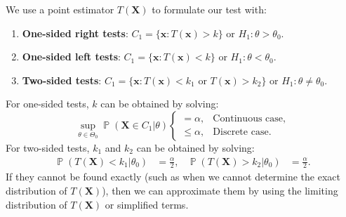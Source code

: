 \documentclass{huhtakm-template-book-v2}
\DeclareMathOperator{\prob}{\mathbb{P}}
\begin{document}
    \begin{rem}
        We use a point estimator $T(\mathbf{X})$ to formulate our test with:
        \begin{enumerate}
            \item \textbf{One-sided right tests}: $C_{1}=\{\mathbf{x}:T(\mathbf{x})>k\}$ or $H_{1}:\theta>\theta_{0}$.
            \item \textbf{One-sided left tests}: $C_{1}=\{\mathbf{x}:T(\mathbf{x})<k\}$ or $H_{1}:\theta<\theta_{0}$.
            \item \textbf{Two-sided tests}: $C_{1}=\{\mathbf{x}:T(\mathbf{x})<k_{1}\text{ or }T(\mathbf{x})>k_{2}\}$ or $H_{1}:\theta\neq\theta_{0}$.
        \end{enumerate}
        For one-sided tests, $k$ can be obtained by solving:
        \begin{equation*}
            \sup_{\theta\in\Theta_{0}}\prob(\mathbf{X}\in C_{1}|\theta)\begin{cases}
                =\alpha, &\text{Continuous case},\\
                \leq\alpha, &\text{Discrete case}.
            \end{cases}
        \end{equation*}
        For two-sided tests, $k_{1}$ and $k_{2}$ can be obtained by solving:
        \begin{align*}
            \prob(T(\mathbf{X})<k_{1}|\theta_{0})&=\frac{\alpha}{2}, & \prob(T(\mathbf{X})>k_{2}|\theta_{0})&=\frac{\alpha}{2}.
        \end{align*}
        If they cannot be found exactly (such as when we cannot determine the exact distribution of $T(\mathbf{X})$), then we can approximate them by using the limiting distribution of $T(\mathbf{X})$ or simplified terms.
    \end{rem}
\end{document}
